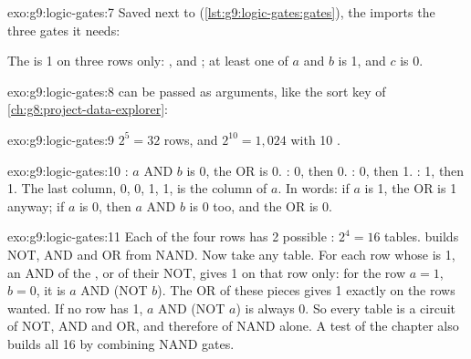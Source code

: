 \begin{solution}{exo:g9:logic-gates:7}
Saved next to  (\cref{lst:g9:logic-gates:gates}), the  imports
the three gates it needs:

\label{lst:g9:logic-gates:sol-table}

The  is 1 on three rows only: ,  and
; at least one of $a$ and $b$ is 1, and $c$ is 0.
\end{solution}

\begin{solution}{exo:g9:logic-gates:8}
 can be passed as arguments, like the sort key of
\cref{ch:g8:project-data-explorer}:

\label{lst:g9:logic-gates:sol-agree}
\end{solution}

\begin{solution}{exo:g9:logic-gates:9}
$2^5 = 32$ rows, and $2^{10} = 1{,}024$ with 10 .
\end{solution}

\begin{solution}{exo:g9:logic-gates:10}
: $a$ AND $b$ is 0, the OR is 0. : 0, then 0.
: 0, then 1. : 1, then 1. The last column, 0, 0, 1, 1, is
the column of $a$. In words: if $a$ is 1, the OR is 1 anyway; if $a$ is 0,
then $a$ AND $b$ is 0 too, and the OR is 0.
\end{solution}

\begin{solution}{exo:g9:logic-gates:11}
Each of the four rows has 2 possible : $2^4 = 16$ tables.
 builds NOT, AND and OR from NAND. Now take any
table. For each row whose  is 1, an AND of the , or of their NOT,
gives 1 on that row only: for the row $a = 1$, $b = 0$, it is $a$ AND
(NOT $b$). The OR of these pieces gives 1 exactly on the rows wanted. If no
row has  1, $a$ AND (NOT $a$) is always 0. So every table is a circuit of
NOT, AND and OR, and therefore of NAND alone. A test of the chapter also
builds all 16 by combining NAND gates.
\end{solution}

